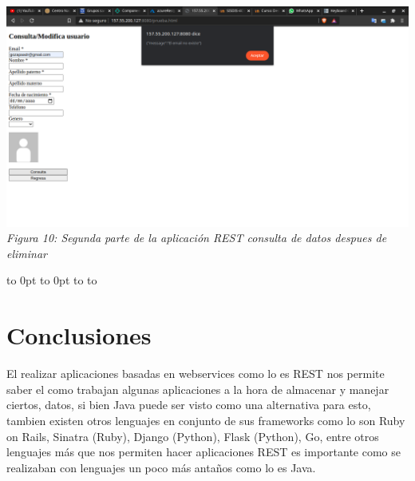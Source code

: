 \documentclass[10pt,executivepaper]{article}
\def\fillandplacepagenumber{%
 \par\pagestyle{empty}%
 \vbox to 0pt{\vss}\vfill
 \vbox to 0pt{\baselineskip0pt
   \hbox to\linewidth{\hss}%
   \baselineskip\footskip
   \hbox to\linewidth{%
     \hfil\thepage\hfil}\vss}}
\begin{document}
\begin{center}
\begin{landscape}
    \includegraphics[scale=0.45]{imgs/consulta-des-eli.png}
    \\\textit{Figura 10: Segunda parte de la aplicación REST consulta de datos despues de eliminar}
    \fillandplacepagenumber
  \end{landscape}
\end{center}

\section{Conclusiones}
El realizar aplicaciones basadas en webservices como lo es REST nos permite saber el como trabajan algunas aplicaciones a la hora de almacenar y manejar ciertos, datos, si bien Java puede ser visto como una alternativa para esto, tambien existen otros lenguajes en conjunto de sus frameworks como lo son Ruby on Rails, Sinatra (Ruby), Django (Python), Flask (Python), Go, entre otros lenguajes más que nos permiten hacer aplicaciones REST es importante como se realizaban con lenguajes un poco más antaños como lo es Java.
\end{document}
